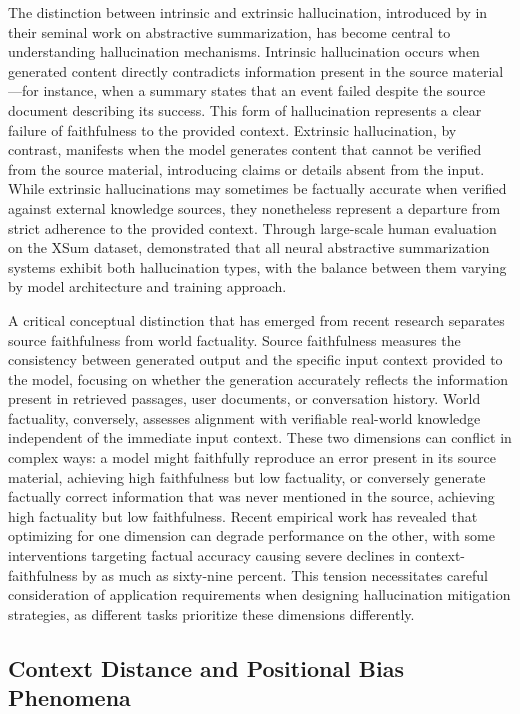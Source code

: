 The distinction between intrinsic and extrinsic hallucination, introduced by \citet{maynez2020faithfulness} in their seminal work on abstractive summarization, has become central to understanding hallucination mechanisms. Intrinsic hallucination occurs when generated content directly contradicts information present in the source material---for instance, when a summary states that an event failed despite the source document describing its success. This form of hallucination represents a clear failure of faithfulness to the provided context. Extrinsic hallucination, by contrast, manifests when the model generates content that cannot be verified from the source material, introducing claims or details absent from the input. While extrinsic hallucinations may sometimes be factually accurate when verified against external knowledge sources, they nonetheless represent a departure from strict adherence to the provided context. Through large-scale human evaluation on the XSum dataset, \citet{maynez2020faithfulness} demonstrated that all neural abstractive summarization systems exhibit both hallucination types, with the balance between them varying by model architecture and training approach.

A critical conceptual distinction that has emerged from recent research separates source faithfulness from world factuality. Source faithfulness measures the consistency between generated output and the specific input context provided to the model, focusing on whether the generation accurately reflects the information present in retrieved passages, user documents, or conversation history. World factuality, conversely, assesses alignment with verifiable real-world knowledge independent of the immediate input context. These two dimensions can conflict in complex ways: a model might faithfully reproduce an error present in its source material, achieving high faithfulness but low factuality, or conversely generate factually correct information that was never mentioned in the source, achieving high factuality but low faithfulness. Recent empirical work has revealed that optimizing for one dimension can degrade performance on the other, with some interventions targeting factual accuracy causing severe declines in context-faithfulness by as much as sixty-nine percent. This tension necessitates careful consideration of application requirements when designing hallucination mitigation strategies, as different tasks prioritize these dimensions differently.

\subsection{Context Distance and Positional Bias Phenomena}

